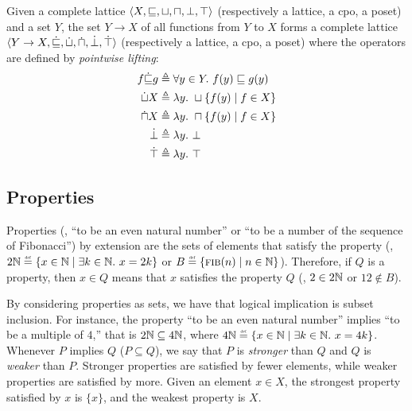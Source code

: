 \begin{definition}
  Given a complete lattice $\langle X, \sqsubseteq, \sqcup, \sqcap, \bot, \top \rangle$ (respectively a lattice, a cpo, a poset) and a set $Y$, the set $Y \to X$ of all functions from $Y$ to $X$ forms a complete lattice $\langle Y \to X, \dot{\sqsubseteq}, \dot{\sqcup}, \dot{\sqcap}, \dot{\bot}, \dot{\top} \rangle$ (respectively a lattice, a cpo, a poset) where the operators are defined by \emph{pointwise lifting}:
\begin{align*}
  f \dot{\sqsubseteq} g & \triangleq \forall y \in Y.~ f(y) \sqsubseteq g(y) \\
  \dot{\sqcup} X & \triangleq \lambda y.~ \sqcup \{f(y) \mid f \in X\} \\
  \dot{\sqcap} X & \triangleq \lambda y.~ \sqcap \{f(y) \mid f \in X\} \\
  \dot{\bot} & \triangleq \lambda y.~ \bot \\
  \dot{\top} & \triangleq \lambda y.~ \top
\end{align*}
\end{definition}


\subsection{Properties}

Properties (\eg, ``to be an even natural number'' or ``to be a number of the sequence of Fibonacci'') by extension are the sets of elements that satisfy the property (\eg, $2\N \defeq \setdef{x \in \N}{\exists k \in \N.\spacer x = 2k}$ or $B \defeq \setdef{\textsc{fib}(n)}{n\in\N}$). Therefore, if $Q$ is a property, then $x \in Q$ means that $x$ satisfies the property $Q$ (\eg, $2 \in 2\mathbb{N}$ or $12 \notin B$).

By considering properties as sets, we have that logical implication is subset inclusion. For instance, the property ``to be an even natural number'' implies ``to be a multiple of $4$,'' that is $2\mathbb{N} \subseteq 4\mathbb{N}$, where $4\N \defeq \setdef{x \in \N}{\exists k \in \N.\spacer x = 4k}$.
Whenever $P$ implies $Q$ ($P \subseteq Q$), we say that $P$ is \emph{stronger} than $Q$ and $Q$ is \emph{weaker} than $P$.
Stronger properties are satisfied by fewer elements, while weaker properties are satisfied by more.
Given an element $x \in X$, the strongest property satisfied by $x$ is $\{x\}$, and the weakest property is $X$.


